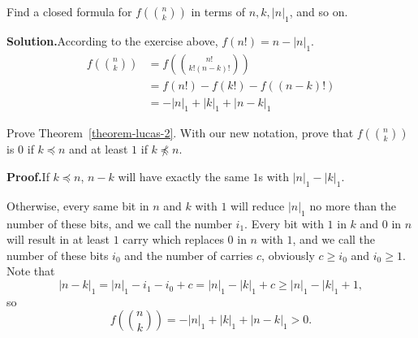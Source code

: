 \begin{exercise}
   Find a closed formula for $f\left({n \choose k}\right)$ in terms of $n, k, |n|_1$, and so on.
\end{exercise}
\textbf{Solution.}According to the exercise above, $f(n!)=n-|n|_1$.
$$
\begin{aligned}
    f\left({n \choose k}\right) & =f\left({{n!} \choose {k!(n-k)!}}\right)
    \\&=f(n!)-f(k!)-f((n-k)!)
    \\&=-|n|_1+|k|_1+|n-k|_1
\end{aligned}
$$

\begin{exercise}
 Prove Theorem~\ref{theorem-lucas-2}. With our new notation, prove that
 $f\left( {n \choose k}\right)$ is $0$ if $k \preceq n$ and at least $1$ if
 $k \not \preceq n$.
\end{exercise}
\textbf{Proof.}If $k \preceq n$, $n-k$ will have exactly the same $1$s with $|n|_1-|k|_1$. 

Otherwise, every same bit in $n$ and $k$ with $1$ will reduce $|n|_1$ no more than the number of these bits, and we call the number $i_1$. Every bit with $1$ in $k$ and $0$ in $n$ will result in at least $1$ carry which replaces $0$ in $n$ with $1$, and we call the number of these  bits $i_0$ and the number of carries $c$, obviously $c\geq i_0$ and $i_0\geq 1$. Note that $$|n-k|_1=|n|_1-i_1-i_0+c=|n|_1-|k|_1+c\geq |n|_1-|k|_1+1,$$ so $$f\left( {n \choose k}\right)=-|n|_1+|k|_1+|n-k|_1>0.$$

